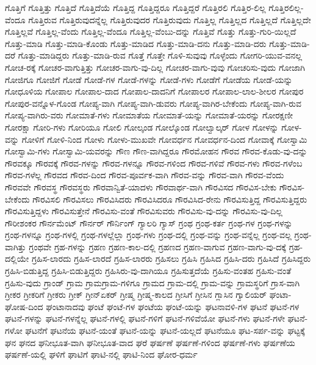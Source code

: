 {ಗೊತ್ತಿಗೆ
ಗೊತ್ತಿತ್ತು
ಗೊತ್ತಿದೆ
ಗೊತ್ತಿದೆಯೆ
ಗೊತ್ತಿದ್ದ
ಗೊತ್ತಿದ್ದರೂ
ಗೊತ್ತಿದ್ದರೆ
ಗೊತ್ತಿರಲಿ
ಗೊತ್ತಿರ-ಲಿಲ್ಲ
ಗೊತ್ತಿರಲಿಲ್ಲ-ವೆಂದೂ
ಗೊತ್ತಿರುವ
ಗೊತ್ತಿರುವುದನ್ನೆಲ್ಲ
ಗೊತ್ತಿರುವುದರ
ಗೊತ್ತಿರುವುದು
ಗೊತ್ತಿಲ್ಲ
ಗೊತ್ತಿಲ್ಲದ
ಗೊತ್ತಿಲ್ಲದೆ
ಗೊತ್ತಿಲ್ಲದೇ
ಗೊತ್ತಿಲ್ಲವೆ
ಗೊತ್ತಿಲ್ಲ-ವೆಂದು
ಗೊತ್ತಿಲ್ಲ-ವೆಂದೂ
ಗೊತ್ತಿಲ್ಲ-ವೆಂಬು-ದನ್ನು
ಗೊತ್ತಿವೆ
ಗೊತ್ತು
ಗೊತ್ತು-ಗುರಿ-ಯಿಲ್ಲದೆ
ಗೊತ್ತು-ಮಾಡಿ
ಗೊತ್ತು-ಮಾಡಿ-ಕೊಂಡು
ಗೊತ್ತು-ಮಾಡಿದ
ಗೊತ್ತು-ಮಾಡಿ-ದನು
ಗೊತ್ತು-ಮಾಡಿ-ದರು
ಗೊತ್ತು-ಮಾಡಿ-ದರೆ
ಗೊತ್ತು-ಮಾಡಿದ್ದರು
ಗೊತ್ತು-ಮಾಡಿ-ರುವ
ಗೊತ್ತೆ
ಗೊತ್ತೇ
ಗೊಳಿ-ಸುವುವು
ಗೊಳ್ಳೆಂದು
ಗೋಗರಿ-ಯುವ-ವನಲ್ಲ
ಗೋಚ-ರಕ್ಕೆ
ಗೋಚರ-ವಾಗುತ್ತಿತ್ತು
ಗೋಚರ-ವಾಗು-ವು-ದಿಲ್ಲ
ಗೋಚರ-ವಾಗು-ವುವು
ಗೋಚರಿಸು-ವುದು
ಗೋಜಾಗಿ
ಗೋಜಿಗೂ
ಗೋಜಿಗೆ
ಗೋಡೆ
ಗೋಡೆ-ಗಳ
ಗೋಡೆ-ಗಳನ್ನು
ಗೋಡೆ-ಗಳು
ಗೋಡೆಗೆ
ಗೋಡೆಯ
ಗೋಡೆ-ಯನ್ನು
ಗೋಧೂಳಿಯ
ಗೋಪಾಲ
ಗೋಪಾಲ-ದಾದ
ಗೋಪಾಲ-ದಾದನಿಗೆ
ಗೋಪಾಲರ
ಗೋಪಾಲ-ಲಾಲ-ಶೀಲರ
ಗೋಪುರ
ಗೋಪುರ-ವನ್ನೊಳ-ಗೊಂಡ
ಗೋಪ್ಯ-ವಾಗಿ
ಗೋಪ್ಯ-ವಾಗಿ-ಡುವರು
ಗೋಪ್ಯ-ವಾಗಿರ-ಬೇಕೆಂದು
ಗೋಪ್ಯ-ವಾಗಿ-ರುವ
ಗೋಪ್ಯ-ವಾಗಿರು-ವರು
ಗೋಮಾತೆ-ಗಳು
ಗೋಮಾತೆಯ
ಗೋಮಾತೆ-ಯನ್ನು
ಗೋಮಾತೆ-ಯರನ್ನು
ಗೋರಕ್ಷಣೀ
ಗೋರಕ್ಷಾ
ಗೋರಿ-ಗಳು
ಗೋರಿಯೂ
ಗೋಲಿ
ಗೋಲ್ಕಂಡ
ಗೋಲ್ಕೊಂಡ
ಗೋಲ್ವಾಲ್ಕರ್
ಗೋಳ
ಗೋಳನ್ನು
ಗೋಳ-ವನ್ನು
ಗೋಳಿಗೆ
ಗೋಳಿ-ನಿಂದ
ಗೋಳು
ಗೋಳು-ಮುಖವೇ
ಗೋವರ್ಧನ
ಗೋವರ್ಧನ-ದಿಂದ
ಗೋವಾಕ್ಕೆ
ಗೋಸ್ವಾಮಿ
ಗೋಸ್ವಾಮಿ-ಗಳು
ಗೋಸ್ವಾಮಿ-ಯವರನ್ನು
ಗೌಣ
ಗೌಣ-ವಾಗಿದ್ದರೂ
ಗೌರಮೋಹನ
ಗೌರವ
ಗೌರವ-ಕೊಡು-ವು-ದನ್ನು
ಗೌರವಕ್ಕೂ
ಗೌರವಕ್ಕೆ
ಗೌರವ-ಗಳನ್ನು
ಗೌರವ-ಗಳನ್ನೂ
ಗೌರವ-ಗಳಿಂದ
ಗೌರವ-ಗಳಿವೆ
ಗೌರವ-ಗಳು
ಗೌರವ-ಗಳೆಂಬ
ಗೌರವ-ಗಳೆಲ್ಲ
ಗೌರವದ
ಗೌರವ-ದಿಂದ
ಗೌರವ-ಪೂರ್ವಕ-ವಾಗಿ
ಗೌರವ-ವನ್ನು
ಗೌರವ-ವಾಗಿ
ಗೌರವ-ವೆಂದು
ಗೌರವವೇ
ಗೌರವಸ್ಥ
ಗೌರವಸ್ಥರು
ಗೌರವಾನ್ವಿತೆ-ಯಾದಳು
ಗೌರವಾರ್ಥ-ವಾಗಿ
ಗೌರವಿಸದ
ಗೌರವಿಸ-ಬೇಕು
ಗೌರವಿಸ-ಬೇಕೆಂದು
ಗೌರವಿಸಲಿ
ಗೌರವಿಸಲು
ಗೌರವಿಸಿದರು
ಗೌರವಿಸಿದರೂ
ಗೌರವಿಸಿದ-ರೇನು
ಗೌರವಿಸುತ್ತಿದ್ದ
ಗೌರವಿಸುತ್ತಿದ್ದರು
ಗೌರವಿಸುತ್ತಿದ್ದಳು
ಗೌರವಿಸುತ್ತೇನೆ
ಗೌರವಿಸು-ವಂತೆ
ಗೌರವಿಸುವರು
ಗೌರವಿಸು-ವು-ದನ್ನು
ಗೌರವಿಸು-ವು-ದಿಲ್ಲ
ಗೌರೀಶಂಕರ
ಗೌರ್ನಮೆಂಟ್
ಗೌರ್ನರ್
ಗೌರ್ನಿಂಗ್
ಗ್ಯಾಲರಿ
ಗ್ಯಾಸ್
ಗ್ರಂಥ
ಗ್ರಂಥ-ಕರ್ತ
ಗ್ರಂಥ-ಗಳ
ಗ್ರಂಥ-ಗಳನ್ನು
ಗ್ರಂಥ-ಗಳನ್ನೂ
ಗ್ರಂಥ-ಗಳಲ್ಲಿ
ಗ್ರಂಥ-ಗಳಲ್ಲೆಲ್ಲಾ
ಗ್ರಂಥ-ಗಳು
ಗ್ರಂಥ-ದಲ್ಲಿ
ಗ್ರಂಥ-ವನ್ನು
ಗ್ರಂಥ-ವನ್ನೆಲ್ಲ
ಗ್ರಂಥ-ವಲ್ಲ
ಗ್ರಂಥ-ವಾಗಿತ್ತು
ಗ್ರಂಥವೇ
ಗ್ರಹ-ಗಳನ್ನು
ಗ್ರಹಣ
ಗ್ರಹಣ-ಕಾಲ-ದಲ್ಲಿ
ಗ್ರಹಣದ
ಗ್ರಹಣ-ವಾಗುವ
ಗ್ರಹಣ-ವಾಗು-ವು-ದಕ್ಕೆ
ಗ್ರಹ-ದಲ್ಲಿಯೇ
ಗ್ರಹಿಸ-ಲಾರದು
ಗ್ರಹಿಸ-ಲಾರದೆ
ಗ್ರಹಿಸ-ಲಾರರು
ಗ್ರಹಿಸಲು
ಗ್ರಹಿಸಿ
ಗ್ರಹಿಸಿದ
ಗ್ರಹಿಸಿ-ದರು
ಗ್ರಹಿಸಿದೆ
ಗ್ರಹಿಸಿದ್ದರು
ಗ್ರಹಿಸಿ-ಬಿಡುತ್ತಿದ್ದ
ಗ್ರಹಿಸಿ-ಬಿಡುತ್ತಿದ್ದರು
ಗ್ರಹಿಸಿರು-ವು-ದಾಗಿಯೂ
ಗ್ರಹಿಸುತ್ತದೆಯೆ
ಗ್ರಹಿಸು-ವಂತಹ
ಗ್ರಹಿಸು-ವಂತೆ
ಗ್ರಹಿಸು-ವುದು
ಗ್ರಾಂಡ್
ಗ್ರಾಮ
ಗ್ರಾಮಗ್ರಾಮ-ಗಳಿಗೂ
ಗ್ರಾಮದ
ಗ್ರಾಮ-ದಲ್ಲಿ
ಗ್ರಾಮ-ವನ್ನು
ಗ್ರಾಮಸ್ಥರಿಗೆ
ಗ್ರಾಸ-ವಾಗಿ
ಗ್ರೀಕರ
ಗ್ರೀಕರಿಗೆ
ಗ್ರೀಕರು
ಗ್ರೀಕ್
ಗ್ರೀನ್ಏಕರ್
ಗ್ರೀಷ್ಮ
ಗ್ರೀಷ್ಮ-ಕಾಲದ
ಗ್ರೀಸಿಗೆ
ಗ್ರೀಸಿನ
ಗ್ಲಾಸಿನ
ಗ್ವಾಲಿಯರ್
ಘಂಟಾ-ಘೋಷ-ದಿಂದ
ಘಂಟಾನಾದವು
ಘಂಟೆ
ಘಂಟೆ-ಗಳ
ಘಂಟೆಯ
ಘಂಟೆ-ಯನ್ನು
ಘಟನಾವಳಿ-ಗಳ
ಘಟನೆ
ಘಟನೆ-ಗಳ
ಘಟನೆ-ಗಳನ್ನು
ಘಟನೆ-ಗಳನ್ನೆಲ್ಲ
ಘಟನೆ-ಗಳಲ್ಲಿ
ಘಟನೆ-ಗಳಿಗೆ
ಘಟನೆ-ಗಳಿವೆಯೋ
ಘಟನೆ-ಗಳು
ಘಟನೆ-ಗಳೇ
ಘಟನೆ-ಗಳೋ
ಘಟನೆಗೆ
ಘಟನೆಯ
ಘಟನೆ-ಯಂತೆ
ಘಟನೆ-ಯನ್ನು
ಘಟನೆ-ಯಲ್ಲದೆ
ಘಟನೆಯೂ
ಘಟ-ಸರ್ಪ-ವನ್ನು
ಘಟ್ಟಕ್ಕೆ
ಘನ
ಘನದ
ಘನೀಭೂತ-ವಾಗಿ
ಘನೀಭೂತ-ವಾದ
ಘರೆ
ಘರ್ಷಣೆ
ಘರ್ಷಣೆ-ಗಳಿಂದ
ಘರ್ಷಣೆ-ಗಳು
ಘರ್ಷಣೆಯ
ಘರ್ಷಣೆ-ಯಲ್ಲಿ
ಘಳಿಗೆ
ಘಾಟಿಗೆ
ಘಾಟಿ-ನಲ್ಲಿ
ಘಾಟಿ-ನಿಂದ
ಘೋರ-ಧರ್ಮ
}
